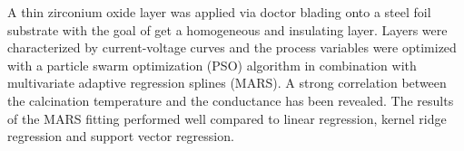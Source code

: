 A thin zirconium oxide layer was applied via doctor blading onto a steel foil substrate with the goal of get a homogeneous and insulating layer.
Layers were characterized by current-voltage curves and the process variables were optimized with a particle swarm optimization (PSO) algorithm in combination with multivariate adaptive regression splines (MARS).
A strong correlation between the calcination temperature and the conductance has been revealed. 
The results of the MARS fitting performed well compared to linear regression, kernel ridge regression and support vector regression.
